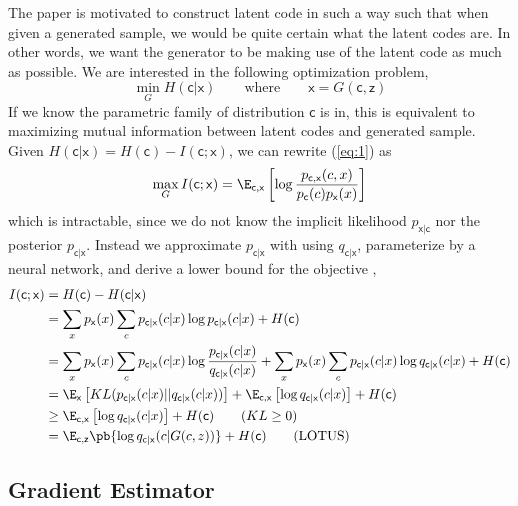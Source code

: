 \documentclass[11pt]{article}
\newcommand\rx{\ensuremath{\mathsf{x}}}
\newcommand\rc{\ensuremath{\mathsf{c}}}
\newcommand\rz{\ensuremath{\mathsf{z}}}
\begin{document}
The paper is motivated to construct latent code in such a way such that when given a generated sample, we would be quite certain what the latent codes are. In other words, we want the generator to be making use of the latent code as much as possible. We are interested in the following optimization problem, 
\begin{equation}
    \label{eq:1}
    \min_{G} H(\rc|\rx) 
    \quad\quad \text{where}\quad\quad
    \rx = G(\rc,\rz)
\end{equation}
If we know the parametric family of distribution $\rc$ is in, this is equivalent to maximizing mutual information between latent codes and generated sample. Given $H(\rc|\rx) = H(\rc) - I(\rc;\rx)$, we can rewrite (\ref{eq:1}) as
\[
    \max_G I(\rc; \rx) 
        = \E_{\rc,\rx}\left[ \log \frac{p_{\rc,\rx}(c,x) }{p_{\rc}(c) p_{\rx}(x)} \right]
\]
which is intractable, since we do not know the implicit likelihood $p_{\rx|\rc}$ nor the posterior $p_{\rc|\rx}$. Instead we approximate $p_{\rc|\rx}$ with using $q_{\rc|\rx}$, parameterize by a neural network, and derive a lower bound for the objective \cite{barberIMAlgorithmVariational2003,pooleVariationalBoundsMutual2019},
\begin{align*}
    I(\rc;\rx)
        &= H(\rc) - H(\rc|\rx) \\
        &= \sum_{x} p_{\rx}(x) \sum_{c} p_{\rc|\rx}(c|x) \log p_{\rc|\rx}(c|x) + H(\rc) \\
        &= \sum_{x} p_{\rx}(x) \sum_{c} p_{\rc|\rx}(c|x) \log \frac{p_{\rc|\rx}(c|x)}{q_{\rc|\rx}(c|x)} + \sum_{x} p_{\rx}(x) \sum_{c} p_{\rc|\rx}(c|x) \log q_{\rc|\rx}(c|x) + H(\rc) \\
        &= \E_{\rx} \left[ KL(p_{\rc|\rx}(c|x) || q_{\rc|\rx}(c|x)) \right] + \E_{\rc,\rx} \left[ \log q_{\rc|\rx}(c|x) \right] + H(\rc) \\
        &\geq  \E_{\rc,\rx} \left[ \log q_{\rc|\rx}(c|x) \right] + H(\rc)  \tag{$KL \geq 0$} \\
        &= \E_{\rc,\rz} \pb{ \log q_{\rc|\rx}(c|G(c,z)) } + H(\rc) \tag{LOTUS}
\end{align*}

\subsection{Gradient Estimator}
\end{document}
